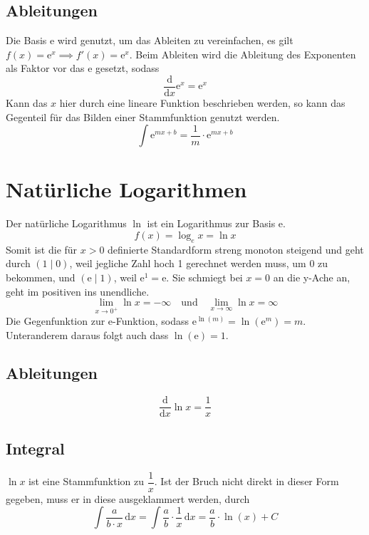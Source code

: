 \documentclass{article}
\begin{document}
\subsection{Ableitungen} 
Die Basis $\mathrm{e}$ wird genutzt, um das Ableiten zu vereinfachen, es gilt $f(x)=\mathrm{e}^x \implies f'(x)=\mathrm{e}^x$. \newline
Beim Ableiten wird die Ableitung des Exponenten als Faktor vor das $\mathrm{e}$ gesetzt, sodass 
\[
 \frac{\mathrm{d}}{\mathrm{d}x} \mathrm{e}^{x} = \mathrm{e}^{x} 
\] 
Kann das $x$ hier durch eine lineare Funktion beschrieben werden, so kann das Gegenteil für das Bilden einer Stammfunktion genutzt werden. 
\[
 \int \mathrm{e}^{mx+b} = \frac{1}{m} \cdot \mathrm{e}^{mx+b}
\] 
\section{Natürliche Logarithmen} 
\begin{minipage}{\dimexpr\textwidth-5cm}  
Der natürliche Logarithmus $\ln$ ist ein Logarithmus zur Basis $\mathrm{e}$.
\[
 f(x) = \log_e{x} = \ln{x}
\] 
Somit ist die für $x>0$ definierte Standardform streng monoton steigend und geht durch ${(1 \mid 0)}$, weil jegliche Zahl hoch 1 gerechnet werden muss, um 0 zu bekommen, und $(\mathrm{e} \mid 1)$, weil $\mathrm{e}^1=\mathrm{e}$. \newline
Sie schmiegt bei $x=0$ an die y-Ache an, geht im positiven ins unendliche.
\[
 \lim_{x \to 0^+} \ln x = -\infty
 \quad \text{und} \quad
 \lim_{x \to \infty} \ln x= \infty
\] 
Die Gegenfunktion zur e-Funktion, sodass $\mathrm{e}^{\ln(m)}=\ln{(\mathrm{e}^m)}=m$. Unteranderem daraus folgt auch dass $\ln(\mathrm{e})=1$.
 
\end{minipage}
\hfill
\begin{minipage}{5cm}  
\centering
\end{minipage}
 
\subsection{Ableitungen} 
\[
 \frac{\mathrm{d}}{\mathrm{d}x} \ln{x} = \frac{1}{x} 
\] 
\subsection{Integral}
$\ln{x}$ ist eine Stammfunktion zu $\dfrac{1}{x}$. Ist der Bruch nicht direkt in dieser Form gegeben, muss er in diese ausgeklammert werden, durch
\[
 \int \frac{a}{b \cdot x} \,\mathrm{d}x =
 \int \frac{a}{b} \cdot \frac{1}{x} \,\mathrm{d}x =
 \frac{a}{b} \cdot \ln(x) + C
\] 
 
\end{document}
